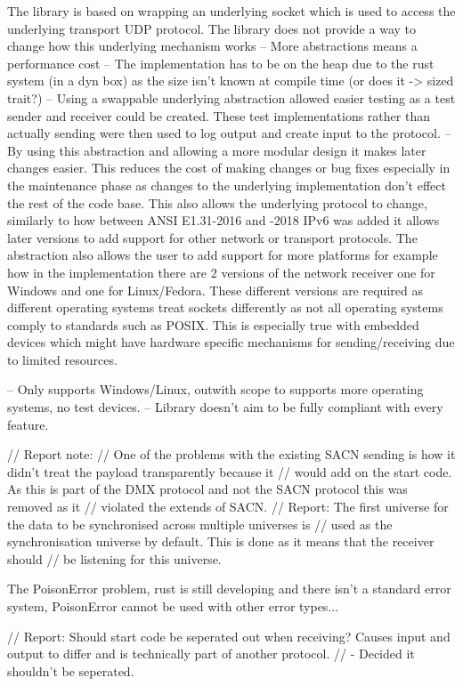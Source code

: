 \documentclass[11pt,a4paper]{article}
\begin{document}
	
The library is based on wrapping an underlying socket which is used to access the underlying transport UDP protocol. The library does not provide a way to change how this underlying mechanism works
-- More abstractions means a performance cost
-- The implementation has to be on the heap due to the rust system (in a dyn box) as the size isn't known at compile time (or does it -> sized trait?)
-- Using a swappable underlying abstraction allowed easier testing as a test sender and receiver could be created. These test implementations rather than actually sending were then used to log output and create input to the protocol. 
-- By using this abstraction and allowing a more modular design it makes later changes easier. This reduces the cost of making changes or bug fixes especially in the maintenance phase as changes to the underlying implementation don't effect the rest of the code base. This also allows the underlying protocol to change, similarly to how between ANSI E1.31-2016 and -2018 IPv6 was added it allows later versions to add support for other network or transport protocols. The abstraction also allows the user to add support for more platforms for example how in the implementation there are 2 versions of the network receiver one for Windows and one for Linux/Fedora. These different versions are required as different operating systems treat sockets differently as not all operating systems comply to standards such as POSIX. This is especially true with embedded devices which might have hardware specific mechanisms for sending/receiving due to limited resources.


-- Only supports Windows/Linux, outwith scope to supports more operating systems, no test devices.
-- Library doesn't aim to be fully compliant with every feature.

// Report note:
// One of the problems with the existing SACN sending is how it didn't treat the payload transparently because it 
// would add on the start code. As this is part of the DMX protocol and not the SACN protocol this was removed as it 
// violated the extends of SACN.
// Report: The first universe for the data to be synchronised across multiple universes is 
// used as the synchronisation universe by default. This is done as it means that the receiver should
// be listening for this universe. 

The PoisonError problem, rust is still developing and there isn't a standard error system, PoisonError cannot be used with other error types... 

// Report: Should start code be seperated out when receiving? Causes input and output to differ and is technically part of another protocol.
// - Decided it shouldn't be seperated.
\end{document}
